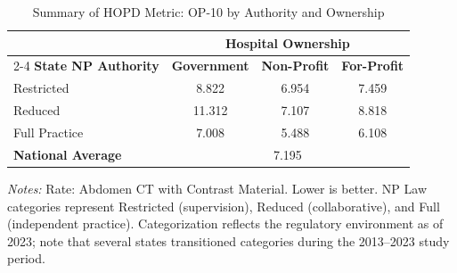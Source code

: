 \begin{table}[htbp]
    \centering
    \caption{Summary of HOPD Metric: OP-10 by Authority and Ownership}
    \label{tab:hopd_op_10}
    \vspace{0.2cm}
    \begin{tabular}{lccc}
        \toprule
        & \multicolumn{3}{c}{\textbf{Hospital Ownership}} \\
        \cmidrule(lr){2-4}
        \textbf{State NP Authority} & \textbf{Government} & \textbf{Non-Profit} & \textbf{For-Profit} \\
        \midrule
        Restricted & 8.822 & 6.954 & 7.459 \\
        Reduced & 11.312 & 7.107 & 8.818 \\
        Full Practice & 7.008 & 5.488 & 6.108 \\
        \midrule
        \textbf{National Average} & \multicolumn{3}{c}{7.195} \\
        \bottomrule
    \end{tabular}
    \vspace{0.1cm}
    \begin{minipage}{0.85\textwidth}
        \footnotesize \textit{Notes:} Rate: Abdomen CT with Contrast Material. Lower is better. NP Law categories represent Restricted (supervision), Reduced (collaborative), and Full (independent practice). Categorization reflects the regulatory environment as of 2023; note that several states transitioned categories during the 2013--2023 study period.
    \end{minipage}
\end{table}